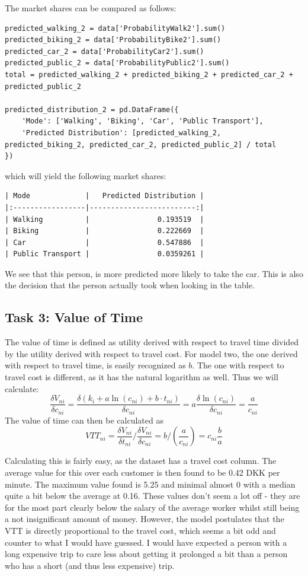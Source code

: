 \documentclass[a4paper,12pt]{article}
\begin{document}
The market shares can be compared as follows:
\begin{verbatim}
predicted_walking_2 = data['ProbabilityWalk2'].sum()
predicted_biking_2 = data['ProbabilityBike2'].sum()
predicted_car_2 = data['ProbabilityCar2'].sum()
predicted_public_2 = data['ProbabilityPublic2'].sum()
total = predicted_walking_2 + predicted_biking_2 + predicted_car_2 + predicted_public_2

predicted_distribution_2 = pd.DataFrame({
    'Mode': ['Walking', 'Biking', 'Car', 'Public Transport'],
    'Predicted Distribution': [predicted_walking_2, predicted_biking_2, predicted_car_2, predicted_public_2] / total
})
\end{verbatim}
which will yield the following market shares:
\begin{verbatim}
| Mode             |   Predicted Distribution |
|:-----------------|-------------------------:|
| Walking          |                0.193519  |
| Biking           |                0.222669  |
| Car              |                0.547886  |
| Public Transport |                0.0359261 |
\end{verbatim}

We see that this person, is more predicted more likely to take the car.
This is also the decision that the person actually took when looking in the table.


\subsection{Task 3: Value of Time}
The value of time is defined as utility derived with respect to travel time divided by the utility derived with respect to travel cost.
For model two, the one derived with respect to travel time, is easily recognized as $b$.
The one with respect to travel cost is different, as it has the natural logarithm as well.
Thus we will calculate:
$$
\dfrac{\delta V_{ni}}{\delta c_{ni}} = \dfrac{\delta \left( k_i + a\ln(c_{ni}) + b\cdot t_{ni} \right)}{\delta c_{ni}} = a \dfrac{\delta \ln(c_{ni})}{\delta c_{ni}} = \frac{a}{c_{ni}}
$$
The value of time can then be calculated as
$$
VTT_{ni}= \dfrac{\delta V_{ni}}{\delta t_{ni}} / \dfrac{\delta V_{ni}}{\delta c_{ni}} = b / \left(\frac{a}{c_{ni}}\right) = c_{ni} \frac{b}{a}
$$

Calculating this is fairly easy, as the dataset has a travel cost column.
The average value for this over each customer is then found to be 0.42 DKK per minute. 
The maximum value found is 5.25 and minimal almost 0 with a median quite a bit below the average at 0.16. 
These values don't seem a lot off - they are for the most part clearly below the salary of the average worker whilst still being a not insignificant amount of money. 
However, the model postulates that the VTT is directly proportional to the travel cost, which seems a bit odd and counter to what I would have guessed. I would have expected a person with a long expensive trip to care less about getting it prolonged a bit than a person who has a short (and thus less expensive) trip.
\end{document}
